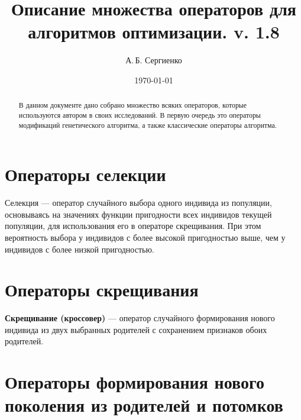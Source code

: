 \documentclass[a4paper,12pt]{article}
\title{Описание множества операторов для алгоритмов оптимизации. v. 1.8}
\author{А.\,Б. Сергиенко}
\date{\today}
\begin{document}


\maketitle

\begin{abstract}
В данном документе дано собрано множество всяких операторов, которые используются автором в своих исследований. В первую очередь это операторы модификаций генетического алгоритма, а также классические операторы алгоритма.
\end{abstract}

\tableofcontents

\newpage




\section{Операторы селекции}\label{SetOfOperatorsAlgorithms:section_selection}

Селекция --- оператор случайного выбора одного индивида из популяции, основываясь на значениях функции пригодности всех индивидов текущей популяции, для использования его в операторе скрещивания. При этом вероятность выбора у индивидов с более высокой пригодностью выше, чем у индивидов с более низкой пригодностью.






\section{Операторы скрещивания}\label{SetOfOperatorsAlgorithms:section_Crossover}

\textbf{Скрещивание (кроссовер)} --- оператор случайного формирования нового индивида из двух выбранных родителей с сохранением признаков обоих родителей.
















\section{Операторы формирования нового поколения из родителей и потомков}\label{SetOfOperatorsAlgorithms:section_forming}
\end{document}
